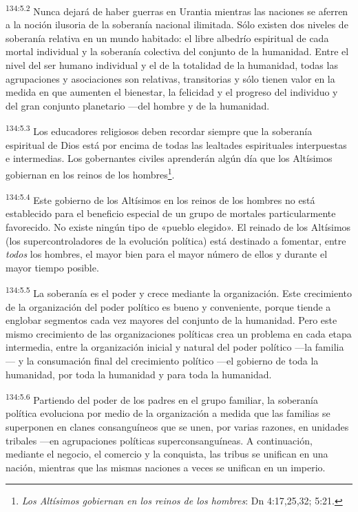 \par 
\textsuperscript{134:5.2} Nunca dejará de haber guerras en Urantia mientras las naciones se aferren a la noción ilusoria de la soberanía nacional ilimitada. Sólo existen dos niveles de soberanía relativa en un mundo habitado: el libre albedrío espiritual de cada mortal individual y la soberanía colectiva del conjunto de la humanidad. Entre el nivel del ser humano individual y el de la totalidad de la humanidad, todas las agrupaciones y asociaciones son relativas, transitorias y sólo tienen valor en la medida en que aumenten el bienestar, la felicidad y el progreso del individuo y del gran conjunto planetario ---del hombre y de la humanidad.

\par 
\textsuperscript{134:5.3} Los educadores religiosos deben recordar siempre que la soberanía espiritual de Dios está por encima de todas las lealtades espirituales interpuestas e intermedias. Los gobernantes civiles aprenderán algún día que los Altísimos gobiernan en los reinos de los hombres\footnote{\textit{Los Altísimos gobiernan en los reinos de los hombres}: Dn 4:17,25,32; 5:21.}.

\par 
\textsuperscript{134:5.4} Este gobierno de los Altísimos en los reinos de los hombres no está establecido para el beneficio especial de un grupo de mortales particularmente favorecido. No existe ningún tipo de «pueblo elegido». El reinado de los Altísimos (los supercontroladores de la evolución política) está destinado a fomentar, entre \textit{todos} los hombres, el mayor bien para el mayor número de ellos y durante el mayor tiempo posible.

\par 
\textsuperscript{134:5.5} La soberanía es el poder y crece mediante la organización. Este crecimiento de la organización del poder político es bueno y conveniente, porque tiende a englobar segmentos cada vez mayores del conjunto de la humanidad. Pero este mismo crecimiento de las organizaciones políticas crea un problema en cada etapa intermedia, entre la organización inicial y natural del poder político ---la familia--- y la consumación final del crecimiento político ---el gobierno de toda la humanidad, por toda la humanidad y para toda la humanidad.

\par 
\textsuperscript{134:5.6} Partiendo del poder de los padres en el grupo familiar, la soberanía política evoluciona por medio de la organización a medida que las familias se superponen en clanes consanguíneos que se unen, por varias razones, en unidades tribales ---en agrupaciones políticas superconsanguíneas. A continuación, mediante el negocio, el comercio y la conquista, las tribus se unifican en una nación, mientras que las mismas naciones a veces se unifican en un imperio.

